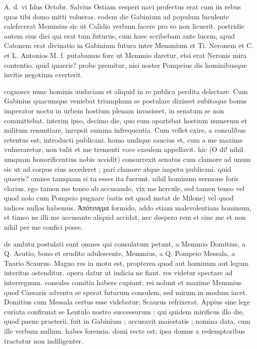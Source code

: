 


 A. d. vi Idus Octobr. Salvius Ostiam vesperi navi profectus erat cum iis rebus quas tibi domo mitti volueras. eodem die Gabinium ad populum luculente calefecerat Memmius sic ut Calidio verbum facere pro eo non licuerit. postridie autem eius diei qui erat tum futurus, cum haec scribebam ante lucem, apud Catonem erat divinatio in Gabinium futura inter Memmium et Ti. Neronem et C. et L. Antonios M. f. putabamus fore ut Memmio daretur, etsi erat Neronis mira contentio. quid quaeris? probe premitur, nisi noster Pompeius dis hominibusque invitis negotium everterit.

 cognosce nunc hominis audaciam et aliquid in re publica perdita delectare. Cum Gabinius quacumque veniebat triumphum se postulare dixisset subitoque bonus imperator noctu in urbem hostium plenam invasisset, in senatum se non committebat. interim ipso, decimo die, quo eum oportebat hostium numerum et militum renuntiare, inrepsit summa infrequentia. Cum vellet exire, a consulibus retentus est; introducti publicani. homo undique saucius et, cum a me maxime vulneraretur, non tulit et me trementi voce exsulem appellavit. hic (O di! nihil umquam honorificentius nobis accidit) consurrexit senatus cum clamore ad unum sic ut ad corpus eius accederet ; pari clamore atque impetu publicani. quid quaeris? omnes tamquam si tu esses ita fuerunt. nihil hominum sermone foris clarius. ego tamen me teneo ab accusando, vix me hercule, sed tamen teneo vel quod nolo cum Pompeio pugnare (satis est quod instat de Milone) vel quod iudices nullos habemus. Ἀπότευγμα formido, addo etiam malevolentiam hominum, et timeo ne illi me accusante aliquid accidat, nec despero rem et sine me et non nihil per me confici posse.

 de ambitu postulati sunt omnes qui consulatum petunt, a Memmio Domitius, a Q. Acutio, bono et erudito adulescente, Memmius, a Q. Pompeio Messala, a Tnario Scaurus. Magno res in motu est, propterea quod aut hominum aut legum interitus ostenditur. opera datur ut iudicia ne fiant. res videtur spectare ad interregnum. consules comitia habere cupiunt; rei nolunt et maxime Memmius quod Caesaris adventu se sperat futurum consulem, sed mirum in modum iacet. Domitius cum Messala certus esse videbatur; Scaurus refrixerat. Appius sine lege curiata confirmat se Lentulo nostro successurum ; qui quidem mirificus illo die, quod paene praeterii, fuit in Gabinium ; accusavit maiestatis ; nomina data, cum ille verbum nullum. habes forensia. domi recte est; ipsa domus a redemptoribus tractatur non indiligenter.
